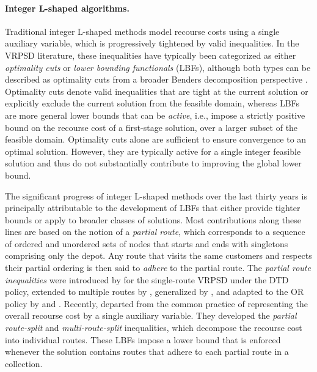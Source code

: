 \documentclass{article}
\newcommand{\rev}[1]{{\color{black}#1}}
\begin{document}
\paragraph{Integer L-shaped algorithms.} Traditional integer L-shaped methods model recourse costs using a single auxiliary variable, which is progressively tightened by valid inequalities. In the VRPSD literature, these inequalities have typically been categorized as either \textit{optimality cuts} or \textit{lower bounding functionals} (LBFs), although both types can be described as optimality cuts from a broader Benders decomposition perspective \cite{hooker2023logic}. Optimality cuts denote valid inequalities that are tight at the current solution or explicitly exclude the current solution from the feasible domain, whereas LBFs are more general lower bounds that can be \textit{active}, \rev{i.e., impose a strictly positive bound on the recourse cost of a first-stage solution}, over a larger subset of the feasible domain. Optimality cuts alone are sufficient to ensure convergence to an optimal solution. However, they are typically active for a single integer feasible solution and thus do not substantially contribute to improving the global lower bound.

The significant progress of integer L-shaped methods over the last thirty years is principally attributable to the development of LBFs that either provide tighter bounds or apply to broader classes of solutions. Most contributions along these lines are based on the notion of a \textit{partial route}, which corresponds to a sequence of ordered and unordered sets of nodes that starts and ends with singletons comprising only the depot. Any route that visits the same customers and respects their partial ordering is then said to \textit{adhere} to the partial route. The \textit{partial route inequalities} were introduced by \cite{hjorring1999new} for the single-route VRPSD under the DTD policy, extended to multiple routes by \cite{laporte2002integer}, generalized by \cite{jabali2014partial}, and adapted to the OR policy by \cite{louveaux2018exact} and \cite{salavati2019exact}. Recently, \cite{hoogendoorn2023improved, hoogendoorn2025evaluation} departed from the common practice of representing the overall recourse cost by a single auxiliary variable. They developed the \textit{partial route-split} and \textit{multi-route-split} inequalities, which decompose the recourse cost into individual routes. These LBFs impose a lower bound that is enforced whenever the solution contains routes that adhere to each partial route in a collection.
\end{document}
